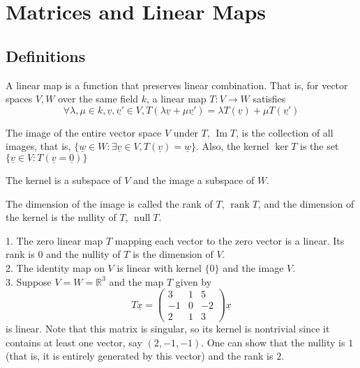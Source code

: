 \section{Matrices and Linear Maps}
\subsection{Definitions}
\begin{definition}
    A linear map is a function that preserves linear combination.
    That is, for vector spaces $V,W$ over the same field $k$, a linear map $T:V\to W$ satisfies
    $$\forall\lambda,\mu\in k, \underline{v},\underline{v'}\in V, T(\lambda\underline{v}+\mu\underline{v'})=\lambda T(\underline{v})+\mu T(\underline{v'})$$
\end{definition}
\begin{definition}
    The image of the entire vector space $V$ under $T$, $\operatorname{Im}T$, is the collection of all images, that is, $\{\underline{w}\in W: \exists \underline{v}\in V,T(\underline{v})=\underline{w}\}$.
    Also, the kernel $\ker T$ is the set $\{\underline{v}\in V: T(\underline{v}=\underline{0})\}$
\end{definition}
\begin{proposition}
    The kernel is a subspace of $V$ and the image a subspace of $W$.
\end{proposition}
\begin{definition}
    The dimension of the image is called the rank of $T$, $\operatorname{rank}T$, and the dimension of the kernel is the nullity of $T$, $\operatorname{null}T$.
\end{definition}
\begin{example}
    1. The zero linear map $T$ mapping each vector to the zero vector is a linear.
    Its rank is $0$ and the nullity of $T$ is the dimension of $V$.\\
    2. The identity map on $V$ is linear with kernel $\{0\}$ and the image $V$.\\
    3. Suppose $V=W=\mathbb R^3$ and the map $T$ given by
    $$
    T\underline{x}=
    \begin{pmatrix}
        3&1&5\\
        -1&0&-2\\
        2&1&3
    \end{pmatrix}
    \underline{x}
    $$
    is linear.
    Note that this matrix is singular, so its kernel is nontrivial since it contains at least one vector, say $(2,-1,-1)$.
    One can show that the nullity is $1$ (that is, it is entirely generated by this vector) and the rank is $2$.
\end{example}
